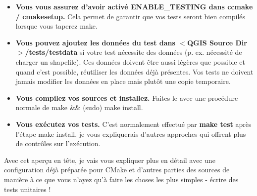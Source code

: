 \begin{itemize}
\item \textbf{Vous vous assurez d'avoir activé ENABLE\_TESTING dans ccmake / cmakesetup.} Cela permet de garantir que vos tests seront bien compilés lorsque vous taperez make.

\item \textbf{Vous pouvez ajoutez les données du test dans $<$QGIS Source Dir$>$/tests/testdata} si votre test nécessite des données (p. ex. nécessité de charger un shapefile). Ces données doivent être aussi légères que possible et quand c'est possible, réutiliser les données déjà présentes. Vos tests ne doivent jamais modifier les données en place mais plutôt une copie temporaire.

\item \textbf{Vous compilez vos sources et installez.} Faites-le avec une procédure normale de make \&\& (sudo) make install.

\item \textbf{Vous exécutez vos tests.} C'est normalement effectué par \textbf{make test} après l'étape make install, je vous expliquerais d'autres approches qui offrent plus de contrôles sur l'exécution.
\end{itemize}

Avec cet aperçu en tête, je vais vous expliquer plus en détail avec une configuration déjà préparée pour CMake et d'autres parties des sources de manière à ce que vous n'ayez qu'à faire les choses les plus simples - écrire des tests unitaires !

